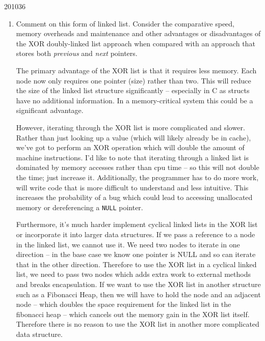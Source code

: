 \documentclass[10pt,\jkfside,a4paper]{article}
\begin{document}
\begin{examquestion}{2010}{3}{6}
\begin{enumerate}[label=(\alph*)]
\item Comment on this form of linked list. Consider the comparative speed,
memory overheads and maintenance and other advantages or disadvantages of
the XOR doubly-linked list approach when compared with an approach that
stores both \textit{previous} and \textit{next} pointers.

The primary advantage of the XOR list is that it requires less memory. Each
node now only requires one pointer (size) rather than two. This will reduce
the size of the linked list structure significantly -- especially in C as
structs have no additional information. In a memory-critical system this
could be a significant advantage.

However, iterating through the XOR list is more complicated and slower.
Rather than just looking up a value (which will likely already be in cache),
we've got to perform an XOR operation which will double the amount of
machine instructions. I'd like to note that iterating through a linked list
is dominated by memory accesses rather than cpu time -- so this will not
double the time; just increase it. Additionally, the programmer has to do
more work, will write code that is more difficult to understand and less
intuitive. This increases the probability of a bug which could lead to
accessing unallocated memory or dereferencing a \texttt{NULL} pointer.

Furthermore, it's much harder implement cyclical linked lists in the XOR list
or incorporate it into larger data structures. If we pass a reference to a
node in the linked list, we cannot use it. We need two nodes to iterate in
one direction -- in the base case we know one pointer is NULL and so can
iterate that in the other direction. Therefore to use the XOR list in a
cyclical linked list, we need to pass two nodes which adds extra work to
external methods and breaks encapsulation. If we want to use the XOR list
in another structure such as a Fibonacci Heap, then we will have to hold
the node and an adjacent node -- which doubles the space requirement for
the linked list in the fibonacci heap -- which cancels out the memory gain
in the XOR list itself. Therefore there is no reason to use the XOR list in
another more complicated data structure.

\end{enumerate}

\end{examquestion}
\end{document}
